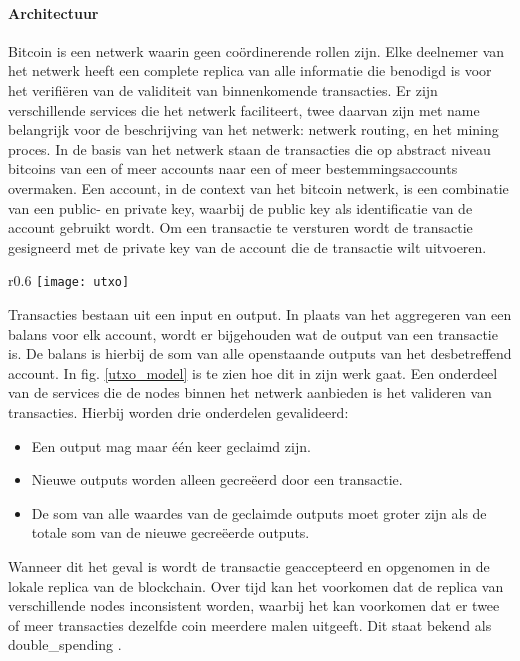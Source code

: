 \paragraph{Architectuur}
Bitcoin is een netwerk waarin geen coördinerende rollen zijn. Elke deelnemer van het netwerk heeft een complete replica van alle informatie die benodigd is voor het verifiëren van de validiteit van binnenkomende transacties. Er zijn verschillende services die het netwerk faciliteert, twee daarvan zijn met name belangrijk voor de beschrijving van het netwerk: netwerk routing, en het mining proces. In de basis van het netwerk staan de transacties die op abstract niveau bitcoins van een of meer accounts naar een of meer bestemmingsaccounts overmaken. Een \gls{account}, in de context van het bitcoin netwerk, is een combinatie van een public- en private key, waarbij de public key als identificatie van de \gls{account} gebruikt wordt. Om een transactie te versturen wordt de transactie gesigneerd met de private key van de \gls{account} die de transactie wilt uitvoeren. 
\begin{wrapfigure}{r}{0.6\textwidth}
  \texttt{[image: utxo]}
  \caption[UTXO-model]{Voorbeeld van het UTXO-model zoals in gebruik bij Bitcoin, bron: http://news.8btc.com/thoughts-on-bytom-design-extension-of-utxo-structure.}
  \label{utxo_model}
\end{wrapfigure}

Transacties bestaan uit een input en output. In plaats van het aggregeren van een balans voor elk \gls{account}, wordt er bijgehouden wat de output van een transactie is. De balans is hierbij de som van alle openstaande outputs van het desbetreffend \gls{account}. In fig. \ref{utxo_model} is te zien hoe dit in zijn werk gaat. Een onderdeel van de services die de \glspl{node} binnen het netwerk aanbieden is het valideren van transacties. Hierbij worden drie onderdelen gevalideerd:

\begin{itemize}

  \item Een output mag maar één keer geclaimd zijn.
  \item Nieuwe outputs worden alleen gecreëerd door een transactie.
  \item De som van alle waardes van de geclaimde outputs moet groter zijn als de totale som van de nieuwe gecreëerde outputs.
\end{itemize}

Wanneer dit het geval is wordt de transactie geaccepteerd en opgenomen in de lokale replica van de blockchain. Over tijd kan het voorkomen dat de replica van verschillende \glspl{node} inconsistent worden, waarbij het kan voorkomen dat er twee of meer transacties dezelfde coin meerdere malen uitgeeft. Dit staat bekend als \gls{double_spending} \citep{6688704}.

